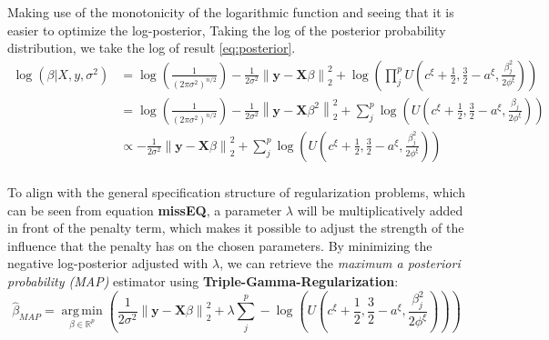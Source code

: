 \documentclass[12pt,a4paper]{article}
\newcommand{\norm}[1]{\left\lVert#1\right\rVert}
\DeclareMathOperator*{\argmin}{arg\,min}
\begin{document}
Making use of the monotonicity of the logarithmic function and seeing that it is easier to optimize the log-posterior, Taking the log of the posterior probability distribution, we take the log of result \ref{eq:posterior}. 
\begin{align}
\log(\beta| X, y, \sigma^2) 	&= \log\left(\frac{1}{(2\pi\sigma^2)^{n/2}}\right) - \frac{1}{2\sigma^2}\norm{\mathbf{y} - \mathbf{X}\beta}_2^2 + \log\left(\prod_j^p U\left(c^\xi + \frac{1}{2}, \frac{3}{2}-a^\xi, \frac{\beta_j^2}{2\phi^\xi}\right)\right)\nonumber\\
							&= \log\left(\frac{1}{(2\pi\sigma^2)^{n/2}}\right) - \frac{1}{2\sigma^2}\norm{\mathbf{y} - \mathbf{X}\beta^2}_2^2 + \sum_j^p \log\left(U\left(c^\xi + \frac{1}{2}, \frac{3}{2}-a^\xi, \frac{\beta_j}{2\phi^\xi}\right)\right)\nonumber\\
							&\propto -\frac{1}{2\sigma^2}\norm{\mathbf{y} - \mathbf{X}\beta}_2^2 + \sum_j^p \log\left(U\left(c^\xi + \frac{1}{2}, \frac{3}{2}-a^\xi, \frac{\beta_j^2}{2\phi^\xi}\right)\right)\nonumber\\
\end{align}

To align with the general specification structure of regularization problems, which can be seen from equation \textbf{missEQ}, a parameter $\lambda$ will be multiplicatively added in front of the penalty term, which makes it possible to adjust the strength of the influence that the penalty has on the chosen parameters. By minimizing the negative log-posterior adjusted with $\lambda$, we can retrieve the \textit{maximum a posteriori probability (MAP)} estimator using \textbf{Triple-Gamma-Regularization}:
\begin{equation}\label{eq:tgr}
\hat{\beta}_{MAP} = \underset{\beta \in \mathbb{R}^p}{\argmin} \left(\frac{1}{2\sigma^2}\norm{\mathbf{y} - \mathbf{X}\beta}_2^2 + \lambda \sum_j^p -\log\left(U\left(c^\xi + \frac{1}{2}, \frac{3}{2}-a^\xi, \frac{\beta_j^2}{2\phi^\xi}\right)\right)\right) 
\end{equation}

\newpage
\end{document}
